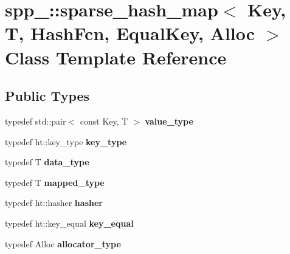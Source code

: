 \hypertarget{classspp___1_1sparse__hash__map}{}\section{spp\+\_\+\+:\+:sparse\+\_\+hash\+\_\+map$<$ Key, T, Hash\+Fcn, Equal\+Key, Alloc $>$ Class Template Reference}
\label{classspp___1_1sparse__hash__map}
\subsection*{Public Types}
\begin{DoxyCompactItemize}
\item 
typedef std\+::pair$<$ const Key, T $>$ {\bfseries value\+\_\+type}\hypertarget{classspp___1_1sparse__hash__map_adedaba969f354207f97cf86c7b046921}{}\label{classspp___1_1sparse__hash__map_adedaba969f354207f97cf86c7b046921}

\item 
typedef ht\+::key\+\_\+type {\bfseries key\+\_\+type}\hypertarget{classspp___1_1sparse__hash__map_a678ed935ca1b316e9e2bca9b4ea2635b}{}\label{classspp___1_1sparse__hash__map_a678ed935ca1b316e9e2bca9b4ea2635b}

\item 
typedef T {\bfseries data\+\_\+type}\hypertarget{classspp___1_1sparse__hash__map_ab879c7d595cededa2bfe9447ed5f0359}{}\label{classspp___1_1sparse__hash__map_ab879c7d595cededa2bfe9447ed5f0359}

\item 
typedef T {\bfseries mapped\+\_\+type}\hypertarget{classspp___1_1sparse__hash__map_ae8f82532e80a409946c96be08adc23d7}{}\label{classspp___1_1sparse__hash__map_ae8f82532e80a409946c96be08adc23d7}

\item 
typedef ht\+::hasher {\bfseries hasher}\hypertarget{classspp___1_1sparse__hash__map_ab66b79a41950ab8357a4e962fba3f1a7}{}\label{classspp___1_1sparse__hash__map_ab66b79a41950ab8357a4e962fba3f1a7}

\item 
typedef ht\+::key\+\_\+equal {\bfseries key\+\_\+equal}\hypertarget{classspp___1_1sparse__hash__map_aad24856fd7e889c177b48dd32c00d813}{}\label{classspp___1_1sparse__hash__map_aad24856fd7e889c177b48dd32c00d813}

\item 
typedef Alloc {\bfseries allocator\+\_\+type}\hypertarget{classspp___1_1sparse__hash__map_a1801eaf312bf2b1b271ddbf12be6762c}{}\label{classspp___1_1sparse__hash__map_a1801eaf312bf2b1b271ddbf12be6762c}


\end{DoxyCompactItemize}
